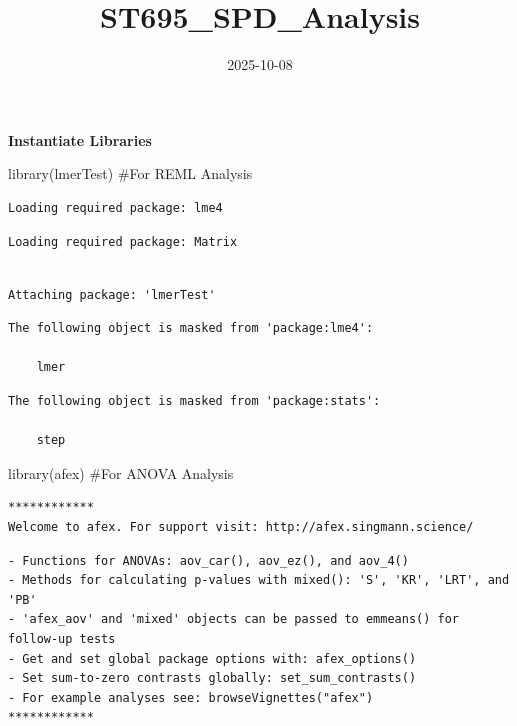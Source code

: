 \documentclass[
  letterpaper,
  DIV=11,
  numbers=noendperiod]{scrartcl}
\title{ST695\_SPD\_Analysis}
\author{}
\date{2025-10-08}
\newenvironment{Shaded}{\begin{snugshade}}{\end{snugshade}}
\newcommand{\CommentTok}[1]{\textcolor[rgb]{0.37,0.37,0.37}{#1}}
\newcommand{\FunctionTok}[1]{\textcolor[rgb]{0.28,0.35,0.67}{#1}}
\newcommand{\NormalTok}[1]{\textcolor[rgb]{0.00,0.23,0.31}{#1}}
\begin{document}
\maketitle


\textbf{Instantiate Libraries}

\begin{Shaded}
\begin{Highlighting}[]
\FunctionTok{library}\NormalTok{(lmerTest) }\CommentTok{\#For REML Analysis}
\end{Highlighting}
\end{Shaded}

\begin{verbatim}
Loading required package: lme4
\end{verbatim}

\begin{verbatim}
Loading required package: Matrix
\end{verbatim}

\begin{verbatim}

Attaching package: 'lmerTest'
\end{verbatim}

\begin{verbatim}
The following object is masked from 'package:lme4':

    lmer
\end{verbatim}

\begin{verbatim}
The following object is masked from 'package:stats':

    step
\end{verbatim}

\begin{Shaded}
\begin{Highlighting}[]
\FunctionTok{library}\NormalTok{(afex) }\CommentTok{\#For ANOVA Analysis}
\end{Highlighting}
\end{Shaded}

\begin{verbatim}
************
Welcome to afex. For support visit: http://afex.singmann.science/
\end{verbatim}

\begin{verbatim}
- Functions for ANOVAs: aov_car(), aov_ez(), and aov_4()
- Methods for calculating p-values with mixed(): 'S', 'KR', 'LRT', and 'PB'
- 'afex_aov' and 'mixed' objects can be passed to emmeans() for follow-up tests
- Get and set global package options with: afex_options()
- Set sum-to-zero contrasts globally: set_sum_contrasts()
- For example analyses see: browseVignettes("afex")
************
\end{verbatim}
\end{document}
